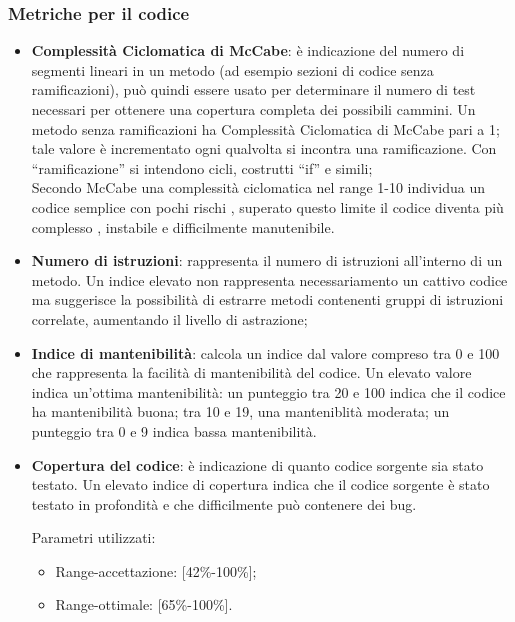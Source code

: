 \subsubsection{Metriche per il codice}
\begin{itemize}
\item \textbf{Complessità Ciclomatica di McCabe}: è indicazione del numero di segmenti lineari in un metodo (ad esempio sezioni di codice senza ramificazioni), può quindi essere usato per determinare il numero di test necessari per ottenere una copertura completa dei possibili cammini. 
Un metodo senza ramificazioni ha Complessità Ciclomatica di McCabe pari a 1; tale valore è incrementato ogni qualvolta si incontra una ramificazione. 
Con “ramificazione” si intendono cicli, costrutti “if” e simili;\\
Secondo McCabe una complessità ciclomatica nel range 1-10 individua un codice semplice con pochi rischi , superato questo limite il codice diventa più complesso , instabile e difficilmente manutenibile.

\item \textbf{Numero di istruzioni}: rappresenta il numero di istruzioni all'interno di un metodo. 
Un indice elevato non rappresenta necessariamento un cattivo codice ma suggerisce la possibilità di estrarre metodi contenenti gruppi di istruzioni correlate, aumentando il livello di astrazione;

\item \textbf{Indice di mantenibilità}: calcola un indice dal valore compreso tra 0 e 100 che rappresenta la facilità di mantenibilità del codice. 
Un elevato valore indica un'ottima mantenibilità: un punteggio tra 20 e 100 indica che il codice ha mantenibilità buona; tra 10 e 19, una manteniblità moderata; un punteggio tra 0 e 9 indica bassa mantenibilità.

\item \textbf{Copertura del codice}: è indicazione di quanto codice sorgente sia stato testato. Un elevato indice di copertura indica che il codice sorgente è stato testato in profondità e che difficilmente può contenere dei bug.

Parametri utilizzati:
\begin{itemize}
\item Range-accettazione: [42\%-100\%];
\item Range-ottimale: [65\%-100\%].
\end{itemize}
\end{itemize}
